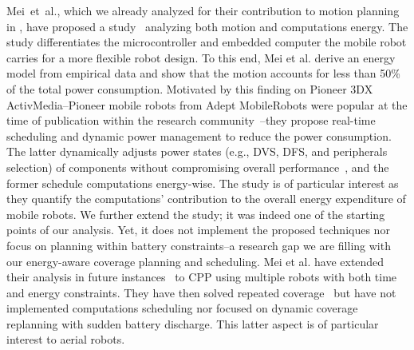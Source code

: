 Mei~et~al., which we already analyzed for their contribution to motion planning in , have proposed a study~\citep{mei2005case} analyzing both motion and computations energy. The study differentiates the microcontroller and embedded computer the mobile robot carries for a more flexible robot design. To this end, Mei et al. derive an energy model from empirical data and show that the motion accounts for less than 50\% of the total power consumption. Motivated by this finding on Pioneer 3DX ActivMedia--Pioneer mobile robots from Adept MobileRobots were popular at the time of publication within the research community~\citep{erickson2003nonlearning,anguelov2004detecting,lemmay2004autonomous}--they propose real-time scheduling and dynamic power management to reduce the power consumption. The latter dynamically adjusts power states (e.g., DVS, DFS, and peripherals selection) of components without compromising overall performance~\citep{mei2005case}, and the former schedule computations energy-wise. The study is of particular interest as they quantify the computations' contribution to the overall energy expenditure of mobile robots. We further extend the study; it was indeed one of the starting points of our analysis. Yet, it does not implement the proposed techniques nor focus on planning within battery constraints--a research gap we are filling with our energy-aware coverage planning and scheduling. Mei et al. have extended their analysis in future instances~\citep{mei2006deployment,mei2005reducing,mei2005deployment} to CPP using multiple robots with both time and energy constraints. They have then solved repeated coverage~\citep{mei2006energy} but have not implemented computations scheduling nor focused on dynamic coverage replanning with sudden battery discharge. This latter aspect is of particular interest to aerial robots.

